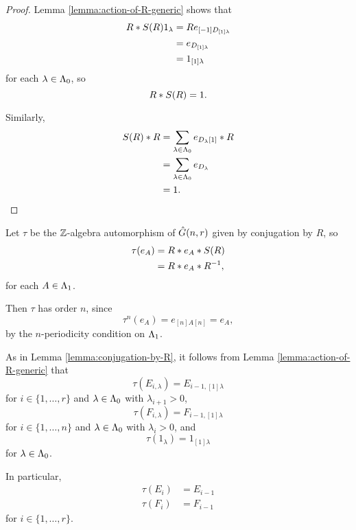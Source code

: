 \documentclass[a4paper, 11pt]{report}
\begin{document}
\begin{proof}
Lemma \ref{lemma:action-of-R-generic} shows that
\begin{align*}
R\ast S{(R)} 1_\lambda &= R e_{[-1]D_{[1]\lambda}}\\
&= e_{D_{[1]\lambda}}\\
&= 1_{[1]\lambda}
\end{align*}
for each $\lambda\in\Lambda_0{}$, so
\begin{equation*}
R \ast S{(R)} = 1.
\end{equation*}

Similarly,
\begin{align*}
S{(R)}\ast R &= \sum_{\lambda\in\Lambda_0{}} e_{D_\lambda [1]}\ast R\\
&= \sum_{\lambda\in\Lambda_0{}} e_{D_\lambda}\\
&= 1.
\end{align*}
\end{proof}

Let $\tau$ be the $\mathbb{Z}$-algebra automorphism of $\hat{G}(n,r)$ given by conjugation by $R$, so
\begin{align*}
\tau(e_A) &= R\ast e_A \ast S{(R)}\\
&= R\ast e_A \ast R^{-1},
\end{align*}
for each $A\in\Lambda_1{}$.

Then $\tau$ has order $n$, since
\begin{equation*}
\tau^n{(e_A)} = e_{[n]A[n]} = e_A,
\end{equation*}
by the $n$-periodicity condition on $\Lambda_1{}$.

As in Lemma \ref{lemma:conjugation-by-R}, it follows from Lemma \ref{lemma:action-of-R-generic} that
\begin{equation*}
\tau{(E_{i,\lambda})} = E_{i-1,[1]\lambda}
\end{equation*}
for $i\in\{1,\ldots,r\}$ and $\lambda\in\Lambda_0{}$ with $\lambda_{i+1}>0$,
\begin{equation*}
\tau{(F_{i,\lambda})} = F_{i-1,[1]\lambda}
\end{equation*}
for $i\in\{1,\ldots,n\}$ and $\lambda\in\Lambda_0{}$ with $\lambda_i>0$, and
\begin{equation*}
\tau{(1_\lambda)} = 1_{[1]\lambda}
\end{equation*}
for $\lambda\in\Lambda_0{}$.

In particular,
\begin{align*}
\tau{(E_i)} &= E_{i-1}\\
\tau{(F_i)} &= F_{i-1}
\end{align*}
for $i\in\{1,\ldots,r\}$.
\end{document}
